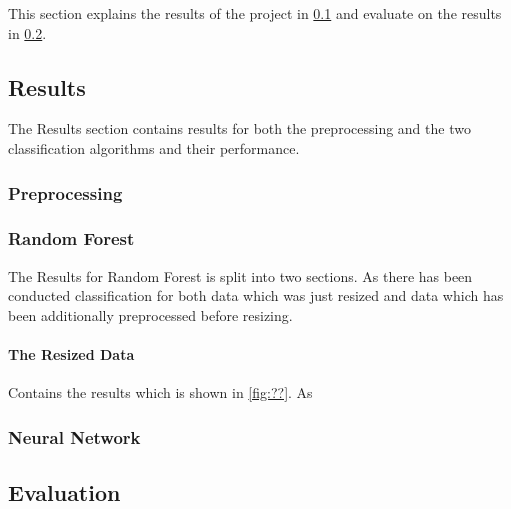 This section explains the results of the project in \ref{subsec:results} and evaluate on the results in \ref{subsec:evaluation}.

\subsection{Results}
\label{subsec:results}
The Results section contains results for both the preprocessing and the two classification algorithms and their performance.

\subsubsection{Preprocessing}








\subsubsection{Random Forest}
The Results for Random Forest is split into two sections. As there has been conducted classification for both data which was just resized and data which has been additionally preprocessed before resizing.

\paragraph{The Resized Data} 
Contains the results which is shown in \ref{fig:??}. As 


\subsubsection{Neural Network}



\subsection{Evaluation}
\label{subsec:evaluation}